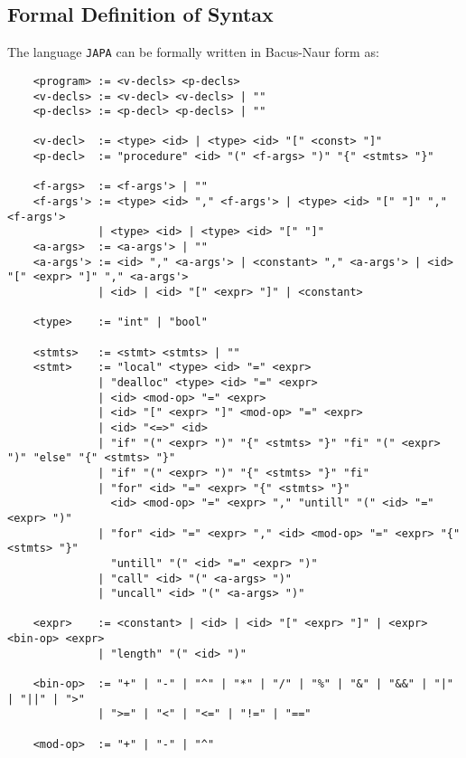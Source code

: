 \subsection{Formal Definition of Syntax}
The language \texttt{JAPA} can be formally written in Bacus-Naur form as:

\begin{verbatim}
    <program> := <v-decls> <p-decls>
    <v-decls> := <v-decl> <v-decls> | ""
    <p-decls> := <p-decl> <p-decls> | ""

    <v-decl>  := <type> <id> | <type> <id> "[" <const> "]"
    <p-decl>  := "procedure" <id> "(" <f-args> ")" "{" <stmts> "}"

    <f-args>  := <f-args'> | ""
    <f-args'> := <type> <id> "," <f-args'> | <type> <id> "[" "]" "," <f-args'>
              | <type> <id> | <type> <id> "[" "]"
    <a-args>  := <a-args'> | ""
    <a-args'> := <id> "," <a-args'> | <constant> "," <a-args'> | <id> "[" <expr> "]" "," <a-args'>
              | <id> | <id> "[" <expr> "]" | <constant> 
    
    <type>    := "int" | "bool"

    <stmts>   := <stmt> <stmts> | ""
    <stmt>    := "local" <type> <id> "=" <expr>
              | "dealloc" <type> <id> "=" <expr>
              | <id> <mod-op> "=" <expr>
              | <id> "[" <expr> "]" <mod-op> "=" <expr>
              | <id> "<=>" <id>
              | "if" "(" <expr> ")" "{" <stmts> "}" "fi" "(" <expr> ")" "else" "{" <stmts> "}"
              | "if" "(" <expr> ")" "{" <stmts> "}" "fi"
              | "for" <id> "=" <expr> "{" <stmts> "}"
                <id> <mod-op> "=" <expr> "," "untill" "(" <id> "=" <expr> ")"
              | "for" <id> "=" <expr> "," <id> <mod-op> "=" <expr> "{" <stmts> "}"
                "untill" "(" <id> "=" <expr> ")"
              | "call" <id> "(" <a-args> ")"
              | "uncall" <id> "(" <a-args> ")"

    <expr>    := <constant> | <id> | <id> "[" <expr> "]" | <expr> <bin-op> <expr>
              | "length" "(" <id> ")"

    <bin-op>  := "+" | "-" | "^" | "*" | "/" | "%" | "&" | "&&" | "|" | "||" | ">"
              | ">=" | "<" | "<=" | "!=" | "=="
    
    <mod-op>  := "+" | "-" | "^"
\end{verbatim}



